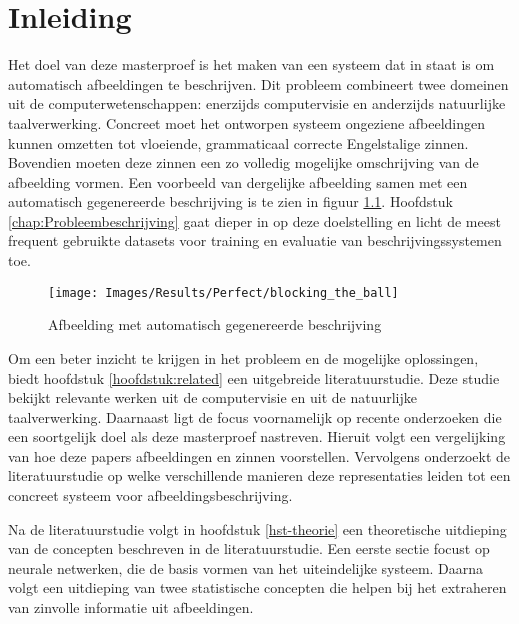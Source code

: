 \chapter{Inleiding}
\label{inleiding}
Het doel van deze masterproef is het maken van een systeem dat in staat is om automatisch afbeeldingen te beschrijven. Dit probleem combineert twee domeinen uit de computerwetenschappen: enerzijds computervisie en anderzijds natuurlijke taalverwerking. Concreet moet het ontworpen systeem ongeziene afbeeldingen kunnen omzetten tot vloeiende, grammaticaal correcte Engelstalige zinnen. Bovendien moeten deze zinnen een zo volledig mogelijke omschrijving van de afbeelding vormen. Een voorbeeld van dergelijke afbeelding samen met een automatisch gegenereerde beschrijving is te zien in figuur \ref{fig:example_img}. Hoofdstuk \ref{chap:Probleembeschrijving} gaat dieper in op deze doelstelling en licht de meest frequent gebruikte datasets voor training en evaluatie van beschrijvingssystemen toe.

\begin{figure}[tb]
    \centering
    \texttt{[image: Images/Results/Perfect/blocking\_the\_ball]}
    \caption{Afbeelding met automatisch gegenereerde beschrijving}
    \label{fig:example_img}
\end{figure}

Om een beter inzicht te krijgen in het probleem en de mogelijke oplossingen, biedt hoofdstuk \ref{hoofdstuk:related} een uitgebreide literatuurstudie. Deze studie bekijkt relevante werken uit de computervisie en uit de natuurlijke taalverwerking. Daarnaast ligt de focus voornamelijk op recente onderzoeken die een soortgelijk doel als deze masterproef nastreven. Hieruit volgt een vergelijking van hoe deze papers afbeeldingen en zinnen voorstellen. Vervolgens onderzoekt de literatuurstudie op welke verschillende manieren deze representaties leiden tot een concreet systeem voor afbeeldingsbeschrijving.

Na de literatuurstudie volgt in hoofdstuk \ref{hst-theorie} een theoretische uitdieping van de concepten beschreven in de literatuurstudie. Een eerste sectie focust op neurale netwerken, die de basis vormen van het uiteindelijke systeem. Daarna volgt een uitdieping van twee statistische concepten die helpen bij het extraheren van zinvolle informatie uit afbeeldingen.

